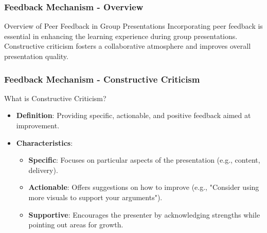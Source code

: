 \documentclass[aspectratio=169]{beamer}
\begin{document}
\begin{frame}[fragile]
    \frametitle{Feedback Mechanism - Overview}
    \begin{block}{Overview of Peer Feedback in Group Presentations}
        Incorporating peer feedback is essential in enhancing the learning experience during group presentations. Constructive criticism fosters a collaborative atmosphere and improves overall presentation quality.
    \end{block}
\end{frame}

\begin{frame}[fragile]
    \frametitle{Feedback Mechanism - Constructive Criticism}
    \begin{block}{What is Constructive Criticism?}
        \begin{itemize}
            \item \textbf{Definition}: Providing specific, actionable, and positive feedback aimed at improvement.
            \item \textbf{Characteristics}:
            \begin{itemize}
                \item \textbf{Specific}: Focuses on particular aspects of the presentation (e.g., content, delivery).
                \item \textbf{Actionable}: Offers suggestions on how to improve (e.g., "Consider using more visuals to support your arguments").
                \item \textbf{Supportive}: Encourages the presenter by acknowledging strengths while pointing out areas for growth.
            \end{itemize}
        \end{itemize}
    \end{block}
\end{frame}
\end{document}
